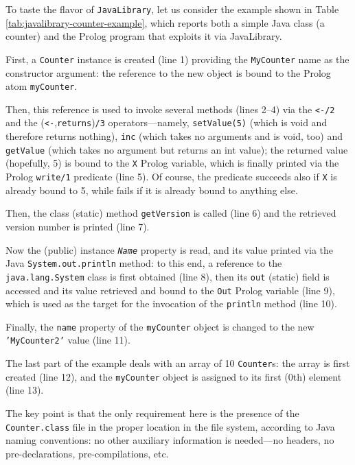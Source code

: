 To taste the flavor of \texttt{JavaLibrary}, let us consider the example shown in Table \ref{tab:javalibrary-counter-example}, which reports both a simple Java class (a counter) and the Prolog program that exploits it via JavaLibrary.

First, a \texttt{Counter} instance is created (line 1) providing the \texttt{MyCounter} name as the constructor argument: the reference to the new object is bound to the Prolog atom \texttt{myCounter}.

Then, this reference is used to invoke several methods (lines 2--4) via the \verb|<-/2| and the (\verb|<-|,\texttt{returns})\texttt{/3} operators---namely, \texttt{setValue(5)} (which is void and therefore returns nothing), \texttt{inc} (which takes no arguments and is void, too) and \texttt{getValue} (which takes no argument but returns an int value);
the returned value (hopefully, 5) is bound to the \texttt{X} Prolog variable, which is finally printed via the Prolog \texttt{write/1} predicate (line 5).
%
Of course, the predicate succeeds also if \texttt{X} is already bound to 5, while fails if it is already bound to anything else.

Then, the class (static) method \texttt{getVersion} is called (line 6) and the retrieved version number is printed (line 7).
 
Now the (public) instance \textit{\texttt{Name}} property is read, and its value printed via the Java \texttt{System.out.println} method: to this end, a reference to the \texttt{java.lang.System} class is first obtained (line 8), then its \texttt{out} (static) field is accessed and its value retrieved and bound to the \texttt{Out} Prolog variable (line 9), which is used as the target for the invocation of the \texttt{println} method (line 10).

Finally, the \texttt{name} property of the \texttt{myCounter} object is changed to the new \texttt{'MyCounter2'} value (line 11).

The last part of the example deals with an array of 10 \texttt{Counter}s: the array is first created (line 12), and the \texttt{myCounter} object is assigned to its first (0th) element (line 13).

The key point is that the only requirement here is the presence of the \texttt{Counter.class} file in the proper location in the file system, according to Java naming conventions: no other auxiliary information is needed---no headers, no pre-declarations, pre-compilations, etc.



